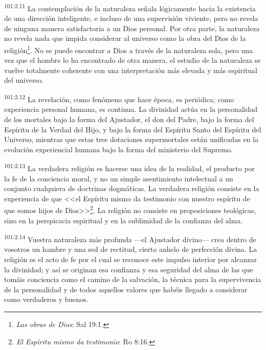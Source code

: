 \documentclass[twoside, 11pt]{book}
\begin{document}
\par
\textsuperscript{101:2.11} La contemplación de la naturaleza señala lógicamente hacia la existencia de una dirección inteligente, e incluso de una supervisión viviente, pero no revela de ninguna manera satisfactoria a un Dios personal. Por otra parte, la naturaleza no revela nada que impida considerar al universo como la obra del Dios de la religión\footnote{\textit{Las obras de Dios}: Sal 19:1.}. No se puede encontrar a Dios a través de la naturaleza sola, pero una vez que el hombre lo ha encontrado de otra manera, el estudio de la naturaleza se vuelve totalmente coherente con una interpretación más elevada y más espiritual del universo.

\par
\textsuperscript{101:2.12} La revelación, como fenómeno que hace época, es periódica; como experiencia personal humana, es continua. La divinidad actúa en la personalidad de los mortales bajo la forma del Ajustador, el don del Padre, bajo la forma del Espíritu de la Verdad del Hijo, y bajo la forma del Espíritu Santo del Espíritu del Universo, mientras que estas tres dotaciones supermortales están unificadas en la evolución experiencial humana bajo la forma del ministerio del Supremo.

\par
\textsuperscript{101:2.13} La verdadera religión es hacerse una idea de la realidad, el producto por la fe de la conciencia moral, y no un simple asentimiento intelectual a un conjunto cualquiera de doctrinas dogmáticas. La verdadera religión consiste en la experiencia de que <<el Espíritu mismo da testimonio con nuestro espíritu de que somos hijos de Dios>>\footnote{\textit{El Espíritu mismo da testimonio}: Ro 8:16.}. La religión no consiste en proposiciones teológicas, sino en la perspicacia espiritual y en la sublimidad de la confianza del alma.

\par
\textsuperscript{101:2.14} Vuestra naturaleza más profunda ---el Ajustador divino--- crea dentro de vosotros un hambre y una sed de rectitud, cierto anhelo de perfección divina. La religión es el acto de fe por el cual se reconoce este impulso interior por alcanzar la divinidad; y así se originan esa confianza y esa seguridad del alma de las que tomáis conciencia como el camino de la salvación, la técnica para la supervivencia de la personalidad y de todos aquellos valores que habéis llegado a considerar como verdaderos y buenos.
\end{document}
